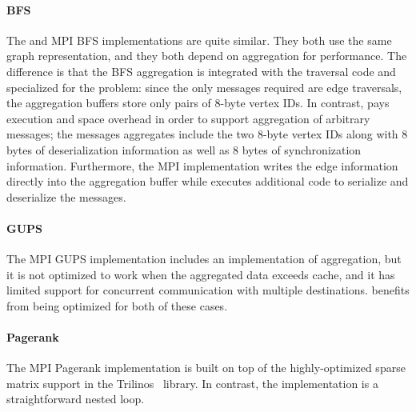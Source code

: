 
\paragraph{BFS}
The \Grappa and MPI BFS implementations are quite similar. They both
use the same graph representation, and they both depend on aggregation
for performance. The difference is that the BFS aggregation is
integrated with the traversal code and specialized for the problem:
since the only messages required are edge traversals, the aggregation
buffers store only pairs of 8-byte vertex IDs.  In contrast, \Grappa
pays execution and space overhead in order to support aggregation of
arbitrary messages; the messages \Grappa aggregates include the two
8-byte vertex IDs along with 8 bytes of deserialization information as
well as 8 bytes of synchronization information. Furthermore, the MPI
implementation writes the edge information directly into the
aggregation buffer while \Grappa executes additional code to serialize
and deserialize the messages.

\paragraph{GUPS}
The MPI GUPS implementation includes an implementation of aggregation,
but it is not optimized to work when the aggregated data exceeds
cache, and it has limited support for concurrent communication with
multiple destinations. \Grappa benefits from being optimized for both
of these cases.

\paragraph{Pagerank}
The MPI Pagerank implementation is built on top of the
highly-optimized sparse matrix support in the Trilinos~\cite{trilinos}
library. In contrast, the \Grappa implementation is a straightforward nested
loop.

